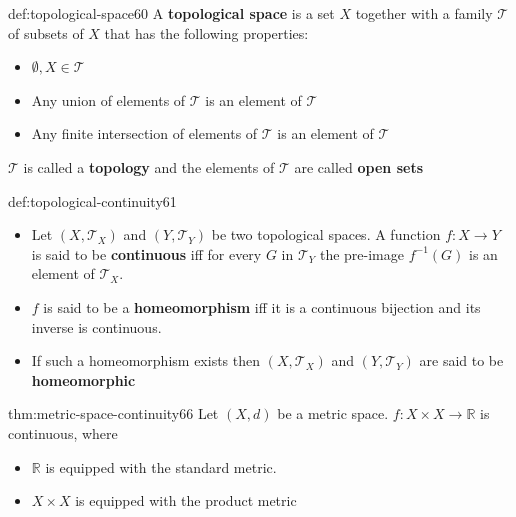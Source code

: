 \documentclass[landscape, 8pt]{extarticle}
\begin{document}
\begin{multicols}{3}
\vspace{-5pt}
\begin{dfn}{def:topological-space}{60}
    \vspace{-5pt}
    A \textbf{topological space} is a set $X$ together with a family $\mathcal{T}$ of subsets of $X$ that has the following properties:
    \vspace{-5pt}
    \begin{itemize}
        \item $\emptyset,X\in \mathcal{T}$
        \item Any union of elements of $\mathcal{T}$ is an element of $\mathcal{T}$
        \item Any finite intersection of elements of $\mathcal{T}$ is an element of $\mathcal{T}$
    \end{itemize}
    \vspace{-5pt}
    $\mathcal{T}$ is called a \textbf{topology} and the elements of $\mathcal{T}$ are called \textbf{open sets}
\end{dfn}

\vspace{-5pt}
\begin{dfn}{def:topological-continuity}{61}
    \vspace{-5pt}
    \begin{itemize}[leftmargin=*]
        \item Let $(X, \mathcal{T}_{X})$ and $(Y, \mathcal{T}_{Y})$ be two topological spaces. A function $f : X \to Y$ is said to be \textbf{continuous} iff for every $G$ in $\mathcal{T}_{Y}$ the pre-image $f^{-1}(G)$ is an element of $\mathcal{T}_{X}$.
        \item $f$ is said to be a \textbf{homeomorphism} iff it is a continuous bijection and its inverse is continuous.
        \item If such a homeomorphism exists then $(X, \mathcal{T}_{X})$ and $(Y, \mathcal{T}_{Y})$ are said to be \textbf{homeomorphic}
    \end{itemize}
\end{dfn}

\begin{thm}{thm:metric-space-continuity}{66}
    \vspace{-5pt}
    Let $(X, d)$ be a metric space. $f: X \times X \to \mathbb{R} $ is continuous, where

    \vspace{-5pt}
    \begin{itemize}
        \item $\mathbb{R}$ is equipped with the standard metric.
        \item $X \times X$ is equipped with the product metric
    \end{itemize}


\end{thm}
\end{multicols}
\end{document}
